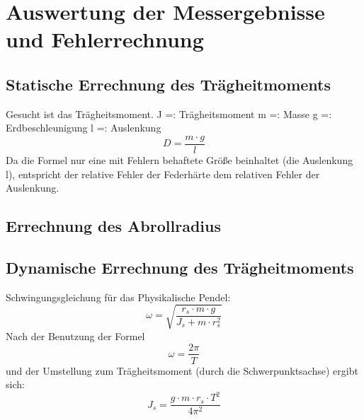 \newpage
\section{ Auswertung der Messergebnisse und Fehlerrechnung}

\subsection{Statische Errechnung des Trägheitmoments}
Gesucht ist das Trägheitsmoment.
\newline
J =: Trägheitsmoment
\newline
m =: Masse
\newline
g =: Erdbeschleunigung
\newline
l =: Auslenkung
\begin{equation}
D = \frac{m\cdot g}{l}
\end{equation}
Da die Formel nur eine mit Fehlern behaftete Größe beinhaltet (die Auslenkung l), entspricht der relative Fehler der Federhärte dem relativen Fehler der Auslenkung.


\begin{table}[thb]
	\centering
	\hline
\end{table}
\subsection{Errechnung des Abrollradius}

\subsection{Dynamische Errechnung des Trägheitmoments}
Schwingungsgleichung für das Physikalische Pendel:
\begin{equation}
\omega = \sqrt{\frac{r_{s}\cdot m\cdot g}{J_{s}+m\cdot r_{s}^{2}}}
\end{equation}
Nach der Benutzung der Formel
\begin{equation}
\omega = \frac{2\pi}{T}
\end{equation}
und der Umstellung zum Trägheitsmoment (durch die Schwerpunktsachse) ergibt sich:
\begin{equation}
J_{s} = \frac{g\cdot m\cdot r_{s} \cdot T^{2}}{4\pi^{2}}
\end{equation}
